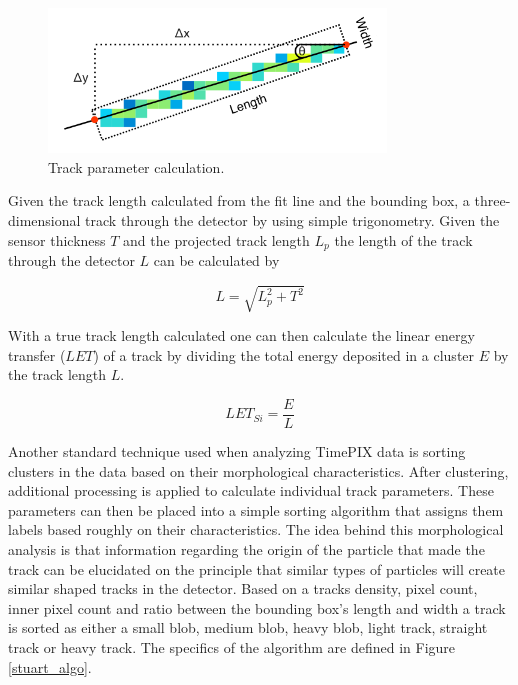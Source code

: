 \begin{figure}[H]
	\begin{center}
	\includegraphics[width=0.8\textwidth]{figures/density.png}
	\caption{Track parameter calculation.\cite{stuartthesis}}
	\label{track_analysis}
	\end{center}
\end{figure}

Given the track length calculated from the fit line and the bounding box, a three-dimensional track through the detector by using simple trigonometry. Given the sensor thickness $T$ and the projected track length $L_{p}$ the length of the track through the detector $L$ can be calculated by

\[L = \sqrt{L_{p}^{2} + T^{2}} \]

With a true track length calculated one can then calculate the linear energy transfer ($LET$) of a track by dividing the total energy deposited in a cluster $E$ by the track length $L$.

\[LET_{Si} = \frac{E}{L}\]





Another standard technique used when analyzing TimePIX data is sorting clusters in the data based on their morphological characteristics. After clustering, additional processing is applied to calculate individual track parameters. These parameters can then be placed into a simple sorting algorithm that assigns them labels based roughly on their characteristics. The idea behind this morphological analysis is that information regarding the origin of the particle that made the track can be elucidated on the principle that similar types of particles will create similar shaped tracks in the detector. Based on a tracks density, pixel count, inner pixel count and ratio between the bounding box's length and width a track is sorted as either a small blob, medium blob, heavy blob, light track, straight track or heavy track. The specifics of the algorithm are defined in Figure \ref{stuart_algo}.

